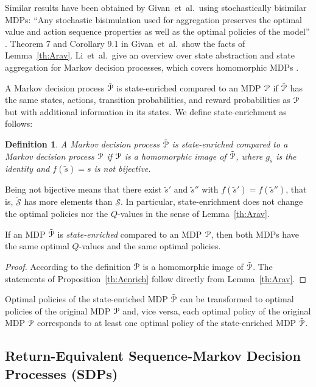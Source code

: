\documentclass{article}
\newtheorem{definitionA}{Definition}
\newcommand{\sS}{\mathscr{S}} \newcommand{\sT}{\mathscr{T}}
\begin{document}
\begin{appendices}
Similar results have been obtained by
Givan~et~al.\ using stochastically bisimilar MDPs:
``Any stochastic bisimulation used for aggregation preserves the
optimal value and action sequence properties as well as the optimal
policies of the model'' \cite{Givan:03}.
Theorem 7 and Corollary 9.1 in Givan~et~al.\ show the facts of
Lemma~\ref{th:Arav}. 
Li~et~al.\ give an overview over state abstraction and state aggregation for
Markov decision processes, which covers homomorphic MDPs \cite{Li:06}.


A Markov decision process $\tilde{\mathcal{P}}$ is state-enriched compared to
an MDP $\mathcal{P}$ if $\tilde{\mathcal{P}}$ has the same states, actions, transition
probabilities, and reward probabilities as
$\mathcal{P}$ but with additional information in its states.
We define state-enrichment as follows:
\begin{definitionA}
  A Markov decision process $\tilde{\mathcal{P}}$ is {\em state-enriched} compared to
  a Markov decision process $\mathcal{P}$ if $\mathcal{P}$ is a homomorphic image of
  $\tilde{\mathcal{P}}$, where $g_{\tilde{s}}$ is the identity and 
  $f(\tilde{s})=s$ is not bijective. 
\end{definitionA}
Being not bijective means that there exist $\tilde{s}'$
and $\tilde{s}''$ with $f(\tilde{s}')=f(\tilde{s}'')$, that is, 
$\tilde{\sS}$ has more elements than $\sS$.
In particular, state-enrichment does not change the optimal policies nor
the $Q$-values in the sense of Lemma~\ref{th:Arav}.
\begin{propositionA}
\label{th:Aenrich}
If an MDP $\tilde{\mathcal{P}}$ is {\em state-enriched} compared to
an MDP $\mathcal{P}$, then both MDPs have the same 
optimal $Q$-values and the same optimal policies. 
\end{propositionA}
\begin{proof}
According to the definition $\mathcal{P}$ is a homomorphic image of
$\tilde{\mathcal{P}}$. The statements of Proposition~\ref{th:Aenrich} 
follow directly from Lemma~\ref{th:Arav}.
\end{proof}
Optimal policies of the 
state-enriched MDP $\tilde{\mathcal{P}}$
can be transformed to optimal policies of the original MDP $\mathcal{P}$ 
and, vice versa, 
each optimal policy of the original MDP $\mathcal{P}$ 
corresponds to at least one optimal
policy of the state-enriched MDP $\tilde{\mathcal{P}}$.

\subsection{Return-Equivalent Sequence-Markov Decision Processes (SDPs)}
\label{sec:AReturnEquivalent}


\end{appendices}
\end{document}
